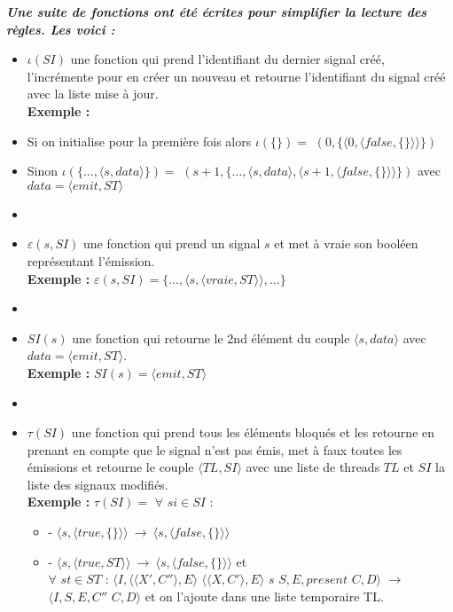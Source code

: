 \documentclass[10pt,a4paper]{report}
\begin{document}
\textbf{\textit{Une suite de fonctions ont été écrites pour simplifier la lecture des règles. Les voici :}}
\smallbreak
\begin{itemize}
\item[] $\iota(SI)$ une fonction qui prend l'identifiant du dernier signal créé, l'incrémente pour en créer un nouveau et retourne l'identifiant du signal créé avec la liste mise à jour.
  \\ \textbf{Exemple :}
\item[] Si on initialise pour la première fois alors  $\iota(\{\}) =$ $(0 ,\{\langle 0,\langle false,\{\}\rangle\rangle\})$
\item[] Sinon $\iota(\{...,\langle s,data\rangle\}) =$ $(s+1 ,\{...,\langle s,data\rangle,\langle s+1,\langle false,\{\}\rangle\rangle\})$ avec $data = \langle emit,ST\rangle$
\item[] 
  
\item[] $\varepsilon(s,SI)$ une fonction qui prend un signal $s$ et met à vraie son booléen représentant l'émission.
  \\\textbf{Exemple :} $\varepsilon(s,SI) = \{...,\langle s,\langle vraie,ST\rangle\rangle,...\}$
\item[] 
  
\item[] $SI(s)$ une fonction qui retourne le 2nd élément du couple $\langle s,data\rangle$ avec $data = \langle emit,ST\rangle$.
  \\\textbf{Exemple :} $SI(s) = \langle emit,ST\rangle$
\item[]  
  
\item[] $\tau(SI)$ une fonction qui prend tous les éléments bloqués et les retourne en prenant en compte que le signal n'est pas émis, met à faux toutes les émissions et retourne le couple $\langle TL,SI \rangle$ avec une liste de threads $TL$ et $SI$ la liste des signaux modifiés. 
  \\ \textbf{Exemple :} $\tau(SI) =$ $\forall$ $si \in SI$ : 
  \begin{itemize}
  \item[] - $\langle s,\langle true,\{\}\rangle\rangle~\rightarrow~\langle s,\langle false,\{\}\rangle\rangle$
  \item[] - $\langle s,\langle true,ST\rangle\rangle~\rightarrow~\langle s,\langle false,\{\}\rangle\rangle$ et 
    \\$\forall$ $st \in ST$ : $\langle I,\langle\langle X',C''\rangle, E\rangle$ $\langle\langle X,C'\rangle, E\rangle$ $s$ $S,E,present$ $C,D\rangle$ $\rightarrow$ $ \langle I,S,E,C''$ $C,D\rangle$ et on l'ajoute dans une liste temporaire TL.
  \end{itemize}
\end{itemize}
\bigbreak
\bigbreak
\end{document}
